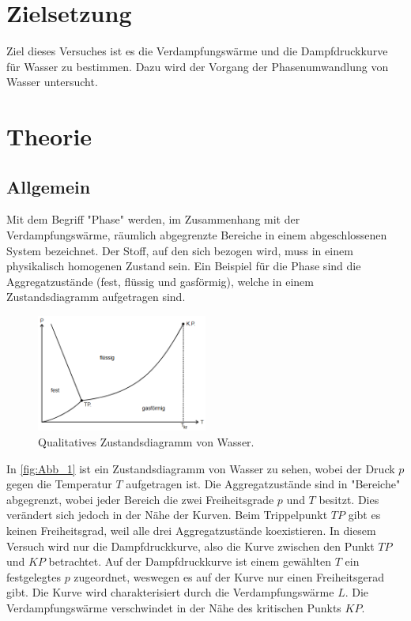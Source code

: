 \section{Zielsetzung}
\label{sec: Zielsetzung}
Ziel dieses Versuches ist es die Verdampfungswärme und die Dampfdruckkurve für Wasser zu bestimmen. 
Dazu wird der Vorgang der Phasenumwandlung von Wasser untersucht.

\section{Theorie}
\label{sec:Theorie}
\subsection{Allgemein} %
\label{sub:Allgemein}
Mit dem Begriff "Phase" werden, im Zusammenhang mit der Verdampfungswärme, räumlich abgegrenzte Bereiche in einem abgeschlossenen System bezeichnet.
Der Stoff, auf den sich bezogen wird, muss in einem physikalisch homogenen Zustand sein. 
Ein Beispiel für die Phase sind die Aggregatzustände (fest, flüssig und gasförmig), welche in einem Zustandsdiagramm aufgetragen sind.
\begin{figure}[H]
    \centering
    \includegraphics[width=0.5\textwidth]{build/Abb_1.PNG}
    \caption {Qualitatives Zustandsdiagramm von Wasser.\cite{v203}}
    \label{fig:Abb_1}
\end{figure}
In \autoref{fig:Abb_1} ist ein Zustandsdiagramm von Wasser zu sehen, wobei der Druck $p$ gegen die Temperatur $T$ aufgetragen ist.
Die Aggregatzustände sind in "Bereiche" abgegrenzt, wobei jeder Bereich die zwei Freiheitsgrade $p$ und $T$ besitzt.
Dies verändert sich jedoch in der Nähe der Kurven. 
Beim Trippelpunkt $TP$ gibt es keinen Freiheitsgrad, weil alle drei Aggregatzustände koexistieren.
In diesem Versuch wird nur die Dampfdruckkurve, also die Kurve zwischen den Punkt $TP$ und $KP$ betrachtet.
Auf der Dampfdruckkurve ist einem gewählten $T$ ein festgelegtes $p$ zugeordnet, weswegen es auf der Kurve nur einen Freiheitsgerad gibt. Die Kurve wird charakterisiert durch die Verdampfungswärme $L$.
Die Verdampfungswärme verschwindet in der Nähe des kritischen Punkts $KP$.

